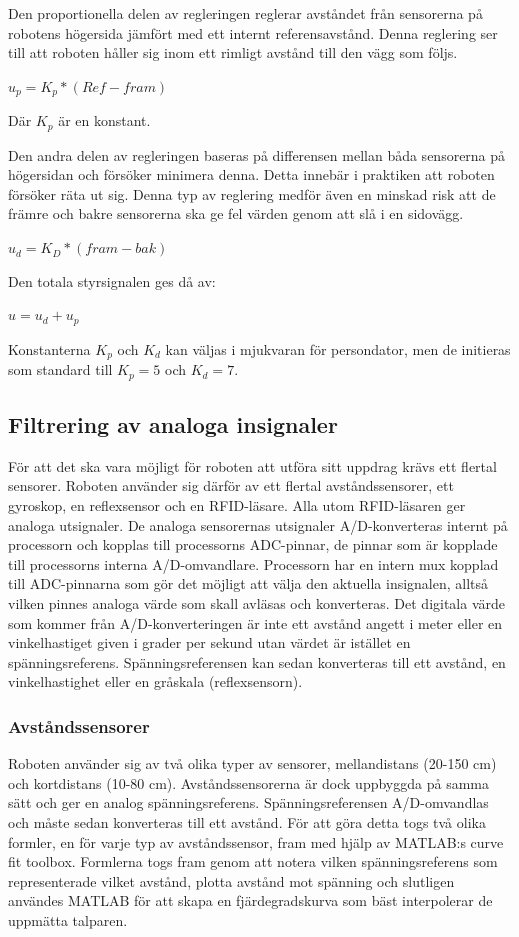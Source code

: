 \documentclass[a4paper,12pt,fleqn]{article}
\begin{document}
Den proportionella delen av regleringen reglerar avståndet från sensorerna på robotens högersida jämfört med ett internt referensavstånd. Denna reglering ser till att roboten håller sig inom ett rimligt avstånd till den vägg som följs.

$ u_p = K_{p}*(Ref-fram) $

Där $K_{p}$ är en konstant.

Den andra delen av regleringen baseras på differensen mellan båda sensorerna på högersidan och försöker minimera denna. Detta innebär i praktiken att roboten försöker räta ut sig. Denna typ av reglering medför även en minskad risk att de främre och bakre sensorerna ska ge fel värden genom att slå i en sidovägg.


$ u_d = K_{D}*(fram - bak) $

Den totala styrsignalen ges då av: 

$u = u_d + u_p$

Konstanterna $K_{p}$ och $K_{d}$ kan väljas i mjukvaran för persondator, men de initieras som standard till $K_{p}=5$ och $K_{d}=7$.

\newpage

\subsection{Filtrering av analoga insignaler}
För att det ska vara möjligt för roboten att utföra sitt uppdrag krävs ett flertal sensorer. Roboten använder sig därför av ett flertal avståndssensorer, ett gyroskop, en reflexsensor och en RFID-läsare. Alla utom RFID-läsaren ger analoga utsignaler. De analoga sensorernas utsignaler A/D-konverteras internt på processorn och kopplas till processorns ADC-pinnar, de pinnar som är kopplade till processorns  interna A/D-omvandlare. Processorn har en intern mux kopplad till ADC-pinnarna som gör det möjligt att välja den aktuella insignalen, alltså vilken pinnes analoga värde som skall avläsas och konverteras. Det digitala värde som kommer från A/D-konverteringen är inte ett avstånd angett i meter eller en vinkelhastiget given i grader per sekund utan värdet är istället en spänningsreferens. Spänningsreferensen kan sedan konverteras till ett avstånd, en vinkelhastighet eller en gråskala (reflexsensorn).

\subsubsection{Avståndssensorer}
Roboten använder sig av två olika typer av sensorer, mellandistans (20-150 cm) och kortdistans (10-80 cm). Avståndssensorerna är dock uppbyggda på samma sätt och ger en analog spänningsreferens. Spänningsreferensen A/D-omvandlas och måste sedan konverteras till ett avstånd. För att göra detta togs två olika formler, en för varje typ av avståndssensor, fram med hjälp av MATLAB:s curve fit toolbox. Formlerna togs fram genom att notera vilken spänningsreferens som representerade vilket avstånd, plotta avstånd mot spänning och slutligen användes MATLAB för att skapa en fjärdegradskurva som bäst interpolerar de uppmätta talparen.
\end{document}
